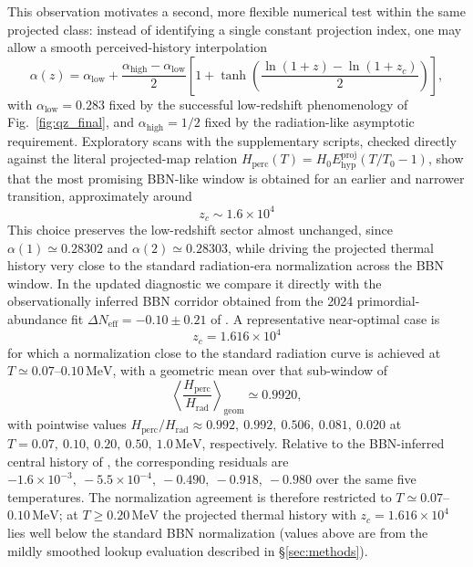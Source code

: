 \documentclass[preprint,12pt]{elsarticle}
\begin{document}
This observation motivates a second, more flexible numerical test within the same projected class: instead of identifying a single constant projection index, one may allow a smooth perceived-history interpolation
\begin{equation}
\alpha(z)=\alpha_{\mathrm{low}}+\frac{\alpha_{\mathrm{high}}-\alpha_{\mathrm{low}}}{2}
\left[
1+\tanh\!\left(
\frac{\ln(1+z)-\ln(1+z_c)}{2}
\right)
\right],
\end{equation}
with $\alpha_{\mathrm{low}}=0.283$ fixed by the successful low-redshift phenomenology of Fig.~\ref{fig:qz_final}, and $\alpha_{\mathrm{high}}=1/2$ fixed by the radiation-like asymptotic requirement. Exploratory scans with the supplementary scripts, checked directly against the literal projected-map relation $H_{\mathrm{perc}}(T)=H_0E_{\mathrm{hyp}}^{\mathrm{proj}}(T/T_0-1)$, show that the most promising BBN-like window is obtained for an earlier and narrower transition, approximately around
\begin{equation}
z_c\sim 1.6\times10^4
\end{equation}
This choice preserves the low-redshift sector almost unchanged, since $\alpha(1)\simeq0.28302$ and $\alpha(2)\simeq0.28303$, while driving the projected thermal history very close to the standard radiation-era normalization across the BBN window. In the updated diagnostic we compare it directly with the observationally inferred BBN corridor obtained from the 2024 primordial-abundance fit $\Delta N_{\mathrm{eff}}=-0.10\pm0.21$ of \cite{schoneberg2024bbn}. A representative near-optimal case is
\begin{equation}
z_c=1.616\times10^4
\end{equation}
for which a normalization close to the standard radiation curve is achieved at $T\simeq0.07$--$0.10\,\mathrm{MeV}$, with a geometric mean over that sub-window of
\begin{equation}
\left\langle \frac{H_{\mathrm{perc}}}{H_{\mathrm{rad}}}\right\rangle_{\mathrm{geom}}
\simeq 0.9920,
\end{equation}
with pointwise values
$H_{\mathrm{perc}}/H_{\mathrm{rad}} \approx
0.992,\ 0.992,\ 0.506,\ 0.081,\ 0.020$
at $T=0.07,\ 0.10,\ 0.20,\ 0.50,\ 1.0\,\mathrm{MeV}$, respectively. Relative to the BBN-inferred central history of \cite{schoneberg2024bbn}, the corresponding residuals are $-1.6\times10^{-3},\ -5.5\times10^{-4},\ -0.490,\ -0.918,\ -0.980$ over the same five temperatures. The normalization agreement is therefore restricted to $T\simeq0.07$--$0.10\,\mathrm{MeV}$; at $T\geq0.20\,\mathrm{MeV}$ the projected thermal history with $z_c=1.616\times10^4$ lies well below the standard BBN normalization (values above are from the mildly smoothed lookup evaluation described in \S\ref{sec:methods}).
\end{document}
